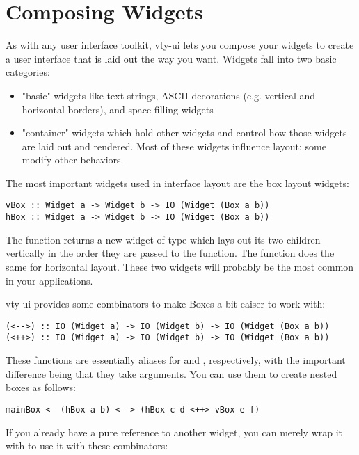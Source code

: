 \section{Composing Widgets}

As with any user interface toolkit, vty-ui lets you compose your widgets
to create a user interface that is laid out the way you want.  Widgets
fall into two basic categories:

\begin{itemize}
\item "basic" widgets like text strings, ASCII decorations
      (e.g. vertical and horizontal borders), and space-filling
      widgets
\item "container" widgets which hold other widgets and control how
      those widgets are laid out and rendered.  Most of these widgets
      influence layout; some modify other behaviors.
\end{itemize}

The most important widgets used in interface layout are the box layout
widgets:

\begin{verbatim}
vBox :: Widget a -> Widget b -> IO (Widget (Box a b))
hBox :: Widget a -> Widget b -> IO (Widget (Box a b))
\end{verbatim}

The  function returns a new widget of type  which lays out its two children vertically in the order they are
passed to the function.  The  function does the same for
horizontal layout.  These two widgets will probably be the most common
in your applications.

vty-ui provides some combinators to make Boxes a bit eaiser to work
with:

\begin{verbatim}
(<-->) :: IO (Widget a) -> IO (Widget b) -> IO (Widget (Box a b))
(<++>) :: IO (Widget a) -> IO (Widget b) -> IO (Widget (Box a b))
\end{verbatim}

These functions are essentially aliases for  and ,
respectively, with the important difference being that they take
 arguments.  You can use them to create nested boxes as
follows:

\begin{verbatim}
mainBox <- (hBox a b) <--> (hBox c d <++> vBox e f)
\end{verbatim}

If you already have a pure reference to another widget, you can merely
wrap it with  to use it with these combinators:

